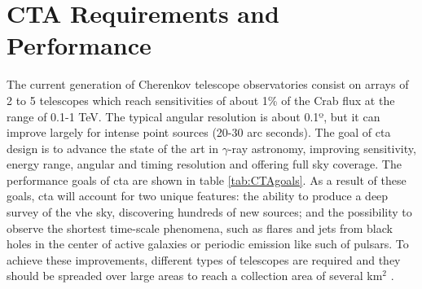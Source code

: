 \documentclass[main.tex]{subfiles}
\begin{document}
\section{CTA Requirements and Performance} \label{sec:ctaperformance}

The current generation of Cherenkov telescope observatories consist on arrays of 2 to 5 telescopes which reach sensitivities of about 1\% of the Crab flux at the range of 0.1-1 TeV. The typical angular resolution is about 0.1º, but it can improve largely for intense point sources (20-30 arc seconds). The goal of \gls{cta} design is to advance the state of the art in $\gamma$-ray astronomy, improving sensitivity, energy range, angular and timing resolution and offering full sky coverage. The performance goals of \gls{cta} are shown in table \ref{tab:CTAgoals}. As a result of these goals, \gls{cta} will account for two unique features: the ability to produce a deep survey of the \gls{vhe} sky, discovering hundreds of new sources; and the possibility to observe the shortest time-scale phenomena, such as flares and jets from black holes in the center of active galaxies or periodic emission like such of pulsars. 
To achieve these improvements, different types of telescopes are required and they should be spreaded over large areas to reach a collection area of several km$^2$ \cite{CTAconcept}.
\end{document}
